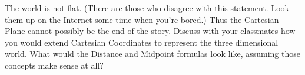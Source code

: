 {\label{orderedtripleexercise} The world is not flat. (There are those who disagree with this statement.  Look them up on the Internet some time when you're bored.)  Thus the Cartesian Plane cannot possibly be the end of the story.  Discuss with your classmates how you would extend Cartesian Coordinates to represent the three dimensional world.  What would the Distance and Midpoint formulas look like, assuming those concepts make sense at all?
}
{}